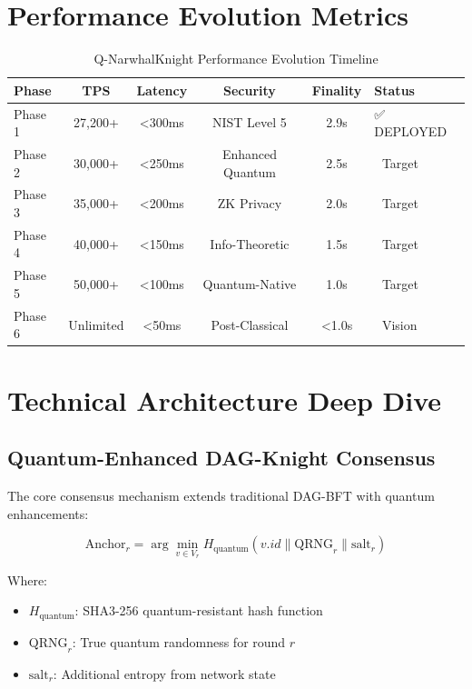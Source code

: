 \documentclass[11pt,a4paper]{article}
\begin{document}
\section{Performance Evolution Metrics}

\begin{table}[h!]
\centering
\begin{tabular}{@{}lccccl@{}}
\toprule
\textbf{Phase} & \textbf{TPS} & \textbf{Latency} & \textbf{Security} & \textbf{Finality} & \textbf{Status} \\
\midrule
Phase 1 & 27,200+ & <300ms & NIST Level 5 & 2.9s & ✅ DEPLOYED \\
Phase 2 & 30,000+ & <250ms & Enhanced Quantum & 2.5s & 🎯 Target \\
Phase 3 & 35,000+ & <200ms & ZK Privacy & 2.0s & 🎯 Target \\
Phase 4 & 40,000+ & <150ms & Info-Theoretic & 1.5s & 🎯 Target \\
Phase 5 & 50,000+ & <100ms & Quantum-Native & 1.0s & 🎯 Target \\
Phase 6 & Unlimited & <50ms & Post-Classical & <1.0s & 🌟 Vision \\
\bottomrule
\end{tabular}
\caption{Q-NarwhalKnight Performance Evolution Timeline}
\end{table}

\section{Technical Architecture Deep Dive}

\subsection{Quantum-Enhanced DAG-Knight Consensus}

The core consensus mechanism extends traditional DAG-BFT with quantum enhancements:

\begin{equation}
\text{Anchor}_r = \arg\min_{v \in V_r} H_{\text{quantum}}(v.id \parallel \text{QRNG}_r \parallel \text{salt}_r)
\end{equation}

Where:
\begin{itemize}
\item $H_{\text{quantum}}$: SHA3-256 quantum-resistant hash function
\item $\text{QRNG}_r$: True quantum randomness for round $r$
\item $\text{salt}_r$: Additional entropy from network state
\end{itemize}
\end{document}
